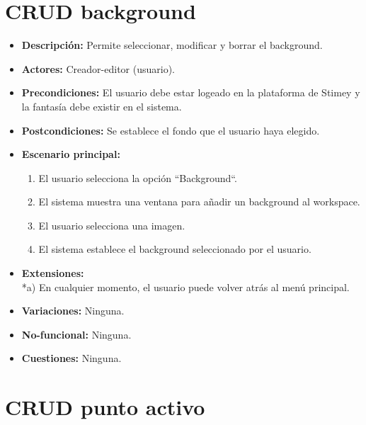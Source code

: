 \documentclass[12pt,letterpaper]{article}
\begin{document}
\section{CRUD background}
\begin{itemize}
	\item \textbf{Descripción:} Permite seleccionar, modificar y borrar el background.
	\item \textbf{Actores:} Creador-editor (usuario).
	\item \textbf{Precondiciones:} El usuario debe estar logeado en la plataforma de Stimey y la fantasía debe existir en el sistema.
	\item \textbf{Postcondiciones:} Se establece el fondo que el usuario haya elegido.
	\item \textbf{Escenario principal:}
	\begin{enumerate}
		\item El usuario selecciona la opción ``Background``.
		\item El sistema muestra una ventana para añadir un background al workspace.
		\item El usuario selecciona una imagen. %
		\item El sistema establece el background seleccionado por el usuario.
	\end{enumerate}
	\item \textbf{Extensiones:} \\ *a) En cualquier momento, el usuario puede volver atrás al menú principal. 
	\item \textbf{Variaciones:} Ninguna.
	\item \textbf{No-funcional:} Ninguna.
	\item \textbf{Cuestiones:} Ninguna.
\end{itemize}


\section{CRUD punto activo}
\end{document}
